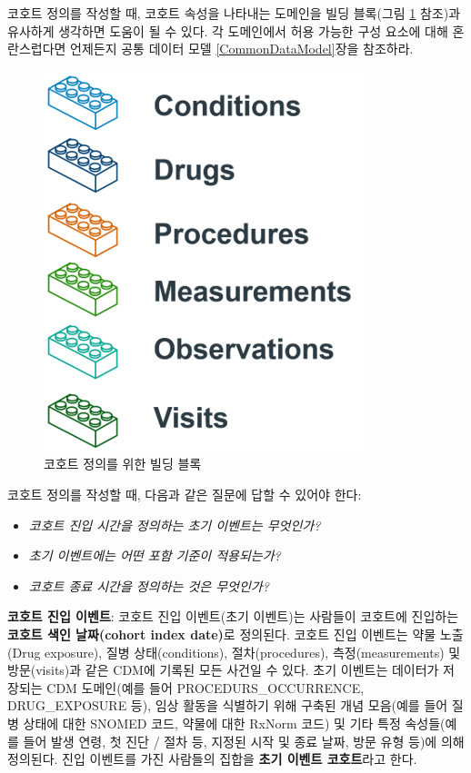 \documentclass[11pt]{book}
\providecommand{\tightlist}{%
  \setlength{\itemsep}{0pt}\setlength{\parskip}{0pt}}
\theoremstyle{definition}
\theoremstyle{definition}
\theoremstyle{definition}
\theoremstyle{remark}
\begin{document}
코호트 정의를 작성할 때, 코호트 속성을 나타내는 도메인을 빌딩 블록(그림
\ref{fig:cohortLegos} 참조)과 유사하게 생각하면 도움이 될 수 있다. 각
도메인에서 허용 가능한 구성 요소에 대해 혼란스럽다면 언제든지 공통
데이터 모델 \ref{CommonDataModel}장을 참조하라.

\begin{figure}

{\centering \includegraphics[width=0.5\linewidth]{images/Cohorts/cohort-legos} 

}

\caption{코호트 정의를 위한 빌딩 블록}\label{fig:cohortLegos}
\end{figure}

코호트 정의를 작성할 때, 다음과 같은 질문에 답할 수 있어야 한다:

\begin{itemize}
\tightlist
\item
  \emph{코호트 진입 시간을 정의하는 초기 이벤트는 무엇인가?}
\item
  \emph{초기 이벤트에는 어떤 포함 기준이 적용되는가?}
\item
  \emph{코호트 종료 시간을 정의하는 것은 무엇인가?}
\end{itemize}

\textbf{코호트 진입 이벤트}: 코호트 진입 이벤트(초기 이벤트)는 사람들이
코호트에 진입하는 \textbf{코호트 색인 날짜(cohort index date)}로
정의된다. 코호트 진입 이벤트는 약물 노출(Drug exposure), 질병
상태(conditions), 절차(procedures), 측정(measurements) 및 방문(visits)과
같은 CDM에 기록된 모든 사건일 수 있다. 초기 이벤트는 데이터가 저장되는
CDM 도메인(예를 들어 PROCEDURS\_OCCURRENCE, DRUG\_EXPOSURE 등), 임상
활동을 식별하기 위해 구축된 개념 모음(예를 들어 질병 상태에 대한 SNOMED
코드, 약물에 대한 RxNorm 코드) 및 기타 특정 속성들(예를 들어 발생 연령,
첫 진단 / 절차 등, 지정된 시작 및 종료 날짜, 방문 유형 등)에 의해
정의된다. 진입 이벤트를 가진 사람들의 집합을 \textbf{초기 이벤트
코호트}라고 한다. 
\end{document}
